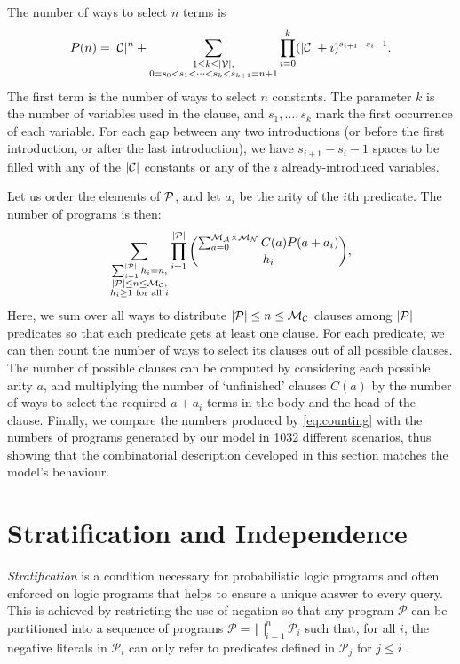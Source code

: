 The number of ways to select $n$ terms is
\[
  P(n) = |\mathcal{C}{}|^n + \sum_{\substack{1 \le k \le |\mathcal{V}{}|, \\ 0 =
      s_0 < s_1 < \dots < s_k < s_{k+1} = n+1}} \prod_{i=0}^k (|\mathcal{C}{}| +
  i)^{s_{i+1} - s_i - 1}.
\]
The first term is the number of ways to select $n$ constants. The parameter $k$
is the number of variables used in the clause, and $s_1, \dots, s_k$ mark the
first occurrence of each variable. For each gap between any two introductions
(or before the first introduction, or after the last introduction), we have
$s_{i+1}-s_i-1$ spaces to be filled with any of the $|\mathcal{C}{}|$ constants
or any of the $i$ already-introduced variables.

Let us order the elements of $\mathcal{P}{}$, and let $a_i$ be the arity of the
$i$th predicate. The number of programs is then:
\begin{equation} \label{eq:counting}
  \sum_{\substack{ \sum_{i=1}^{|\mathcal{P}{}|} h_i = n,\\
      |\mathcal{P}{}| \le n \le \mathcal{M}_{\mathcal{C}}{},\\
      h_i \ge 1 \text{ for all } i}} \prod_{i=1}^{|\mathcal{P}{}|}
  \binom{\sum_{a=0}^{\mathcal{M}_{\mathcal{A}}{} \times \mathcal{M}_{\mathcal{N}}{}} C(a) P(a+a_i)}{h_i},
\end{equation}
Here, we sum over all ways to distribute $|\mathcal{P}{}| \le n \le
\mathcal{M}_{\mathcal{C}}{}$ clauses among $|\mathcal{P}{}|$ predicates so that each
predicate gets at least one clause. For each predicate, we can then count the
number of ways to select its clauses out of all possible clauses. The number of
possible clauses can be computed by considering each possible arity $a$, and
multiplying the number of `unfinished' clauses $C(a)$ by the number of ways to
select the required $a+a_i$ terms in the body and the head of the clause.
Finally, we compare the numbers produced by \eqref{eq:counting} with the numbers
of programs generated by our model in \num{1032} different scenarios, thus
showing that the combinatorial description developed in this section matches the
model's behaviour.

\section{Stratification and Independence} \label{sec:independence}

\emph{Stratification} is a condition necessary for probabilistic logic programs
\citep{DBLP:conf/padl/MantadelisR17} and often enforced on logic programs
\citep{DBLP:journals/tcs/Bidoit91} that helps to ensure a unique answer to every
query. This is achieved by restricting the use of negation so that any program
$\mathscr{P}$ can be partitioned into a sequence of programs $\mathscr{P} =
\bigsqcup_{i=1}^n \mathscr{P}_i$ such that, for all $i$, the negative literals
in $\mathscr{P}_i$ can only refer to predicates defined in $\mathscr{P}_j$ for
$j \le i$ \citep{DBLP:journals/tcs/Bidoit91}.

